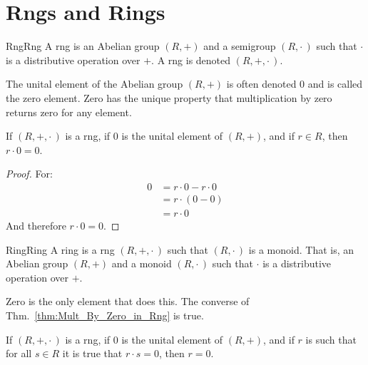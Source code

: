 \section{Rngs and Rings}
    \begin{fdefinition}{Rng}{Rng}
        A rng is an \gls{Abelian group} $(R,+)$ and a \gls{semigroup}
        $(R,\cdot\,)$ such that $\cdot$ is a \gls{distributive operation}
        over $+$. A rng is denoted $(R,+,\cdot\,)$.
    \end{fdefinition}
    The unital element of the Abelian group $(R,+)$ is often denoted 0 and is
    called the zero element. Zero has the unique property that multiplication
    by zero returns zero for any element.
    \begin{theorem}
        \label{thm:Mult_By_Zero_in_Rng}%
        If $(R,+,\cdot\,)$ is a rng, if 0 is the unital element of $(R,+)$, and
        if $r\in{R}$, then $r\cdot{0}=0$.
    \end{theorem}
    \begin{proof}
        For:
        \begin{align}
            0&=r\cdot{0}-r\cdot{0}
            \tag{Inverse Property of Groups}\\
            &=r\cdot(0-0)
            \tag{Distributive Property}\\
            &=r\cdot{0}
            \tag{Identity Property}
        \end{align}
        And therefore $r\cdot{0}=0$.
    \end{proof}
    \begin{fdefinition}{Ring}{Ring}
        A \gls{ring} is a \gls{rng} $(R,+,\cdot\,)$ such that $(R,\cdot\,)$ is
        a \gls{monoid}. That is, an \gls{Abelian group} $(R,+)$ and a monoid
        $(R,\cdot\,)$ such that $\cdot$ is a \gls{distributive operation} over
        $+$.
    \end{fdefinition}
    Zero is the only element that does this. The converse of
    Thm.~\ref{thm:Mult_By_Zero_in_Rng} is true.
    \begin{theorem}
        \label{thm:Mult_by_Zero_Always_Zero_Implies_Zero}%
        If $(R,+,\cdot\,)$ is a rng, if $0$ is the unital element of $(R,+)$,
        and if $r$ is such that for all $s\in{R}$ it is true that $r\cdot{s}=0$,
        then $r=0$.
    \end{theorem}
